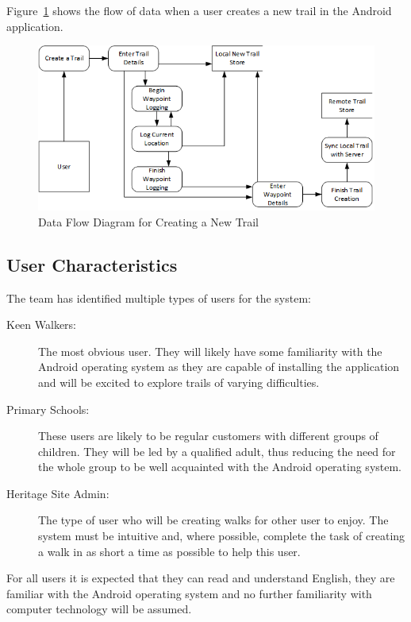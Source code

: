 \documentclass[11pt,a4paper]{article}
\begin{document}
Figure~\ref{fig:createTrailDFD} shows the flow of data when a user creates a new trail in the Android application.

\begin{figure}[H]
\begin{center}
\includegraphics[scale=0.65]{createTrailDFD.png}
\caption{Data Flow Diagram for Creating a New Trail}
\label{fig:createTrailDFD}
\end{center}
\end{figure}


\subsection{User Characteristics}
\label{sec:user-characteristics}

The team has identified multiple types of users for the system:
\begin{description}
\item[Keen Walkers:] The most obvious user. They will likely have some familiarity with the Android operating system as they are capable of installing the application and will be excited to explore trails of varying difficulties.
\item[Primary Schools:] These users are likely to be regular customers with different groups of children. They will be led by a qualified adult, thus reducing the need for the whole group to be well acquainted with the Android operating system.
\item[Heritage Site Admin:] The type of user who will be creating walks for other user to enjoy. The system must be intuitive and, where possible, complete the task of creating a walk in as short a time as possible to help this user.
\end{description}

For all users it is expected that they can read and understand English, they are familiar with the Android operating system and no further familiarity with computer technology will be assumed.
\end{document}
